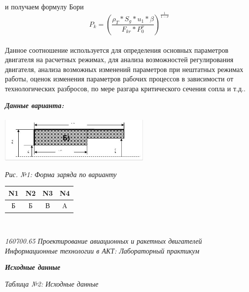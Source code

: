 \documentclass{article}
\begin{document}
и получаем формулу Бори
\begin{equation}\label{eq:fourierrow} 
P_k = {(\frac{\rho_T * S_g * u_1 * \beta}{F_{kr} * P_0^\nu})}^{\frac{1}{1 - \nu}}
\end{equation}\\
Данное соотношение используется для определения основных параметров двигателя на расчетных режимах, для анализа возможностей регулирования двигателя, анализа возможных изменений параметров при нештатных режимах работы, оценок изменения параметров рабочих процессов в зависимости от технологических разбросов, по мере разгара критического сечения сопла и т.д..\\
\begin{center}
\textbf{\textit{Данные варианта:}}\\
~\\
\includegraphics[width=7.4cm]{1} \\
\end{center}
\begin{flushright}
{\textit{Рис. №1: Форма заряда по варианту}}\\
\end{flushright}
\begin{center}
\begin{tabular}{  | c | c | c | c | }
\hline
N1 & N2 & N3 & N4 \\
\hline
Б & Б & В & A \\
\hline
\end{tabular}
\end{center}
~\\
\begin{flushright}
\begin{scriptsize}
\textit{160700.65   Проектирование авиационных и ракетных двигателей\\
 Информационные технологии в АКТ: Лабораторный практикум} \\
 \end{scriptsize}
\end{flushright}
\begin{center}
\textbf{\textit{Исходные данные}}\\
\end{center}
\begin{flushright}
\textit{Таблица №2: Исходные данные}\\
\end{flushright}
\end{document}
